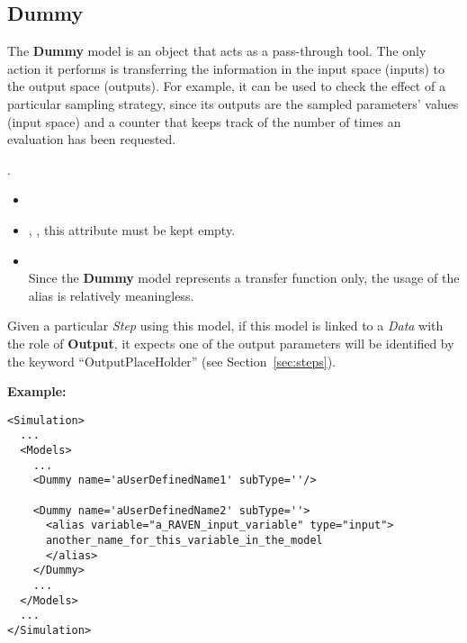 \subsection{Dummy}
\label{subsec:models_dummy}
The \textbf{Dummy} model is an object that acts as a pass-through tool.
%
The only action it performs is transferring the information in the input
space (inputs) to the output space (outputs).
%
For example, it can be used to check the effect of a particular sampling
strategy, since its outputs are the sampled parameters' values (input space) and
a counter that keeps track of the number of times an evaluation has been
requested.
%

.
%
\attrsIntro
%
\vspace{-5mm}
\begin{itemize}
  \itemsep0em
  \item \nameDescription
  \item {}, , this attribute
  must be kept empty.
\end{itemize}
\vspace{-5mm}

\subnodesIntro
%
\begin{itemize}
  \item {}
  \\Since the \textbf{Dummy} model represents a transfer function only, the usage of the alias is relatively meaningless.
\end{itemize}

Given a particular \textit{Step} using this model, if this model is linked to
a \textit{Data} with the role of \textbf{Output}, it expects one of the output
parameters will be identified by the keyword ``OutputPlaceHolder'' (see
Section~\ref{sec:steps}).

\textbf{Example:}
\begin{lstlisting}[style=XML,morekeywords={subType}]
<Simulation>
  ...
  <Models>
    ...
    <Dummy name='aUserDefinedName1' subType=''/>

    <Dummy name='aUserDefinedName2' subType=''>
      <alias variable="a_RAVEN_input_variable" type="input">
      another_name_for_this_variable_in_the_model
      </alias>
    </Dummy>
    ...
  </Models>
  ...
</Simulation>
\end{lstlisting}






